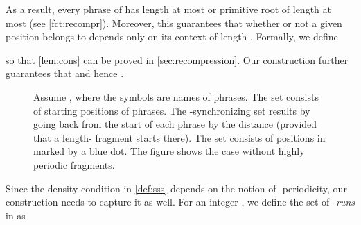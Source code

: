 \documentclass[a4paper]{article}
\theoremstyle{definition}
\theoremstyle{remark}
\begin{document}
As a result, every phrase of  has length at most  or primitive root of length at most  (see \cref{fct:recompr}).
Moreover, this guarantees that whether or not a given  position belongs to  depends only on its context of length .
Formally, we define

so that \cref{lem:cons} can be proved in \cref{sec:recompression}.
Our construction further guarantees that  and hence .

\begin{figure}[h]
\centering
{}

 \caption{Assume , where the symbols  are names of phrases.
The set  consists of starting positions of phrases.
The -synchronizing set results by 
going back from the start of each phrase by the distance  (provided that a length- fragment starts there).
The set  consists of positions in  marked by a blue dot. 
The figure shows the case without highly periodic fragments.
}\label{fig:ss}
\end{figure}

Since the density condition in \cref{def:sss} depends on the notion of -periodicity,
our construction needs to capture it as well.
For an integer , we define the set of \emph{-runs} in  as 
\end{document}
